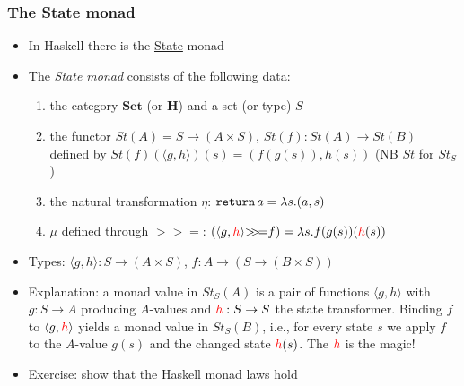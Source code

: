\documentclass[handout]{beamer}
\newcommand{\bfsf}[1]{{\boldsymbol{#1}}}
\newcommand{\Set}{\bfsf{Set}}
\newcommand{\HH}{\bfsf{H}}
\newcommand{\Kp}[1]{{\langle #1 \rangle}}
\newcommand{\bind}{{>}\!\!{>}\!{=}}
\newcommand{\ttt}[1]{\text{\tt #1}}
\begin{document}
\frame
  {   
    \frametitle{The State monad}\label{Mon5:MonadState}

 \begin{itemize}[<+->]
\item In Haskell there is the 
\href{https://wiki.haskell.org/All_About_Monads\#The_State\_monad}%
{\color{blue}State} monad
\item The \emph{State monad} consists of the following data:
 \begin{enumerate}
    \item the category $\Set$ (or $\HH$) and a set (or type) $S$
    \item the functor $St(A) = S \to (A\times S)$, $St(f) : St(A)\to St(B)$ defined by
$St(f)(\Kp{g,h})(s) = (f(g(s)),h(s))$ (NB $St$ for $St_S$)%
    \item the natural transformation $\eta$: $\ttt{return}\,a = \lambda s. (a,s)$
    \item $\mu$ defined through $\bind$:
$(\Kp{g,{\color{red}h}} \bind f ) =  \lambda s. f(g(s))({\color{red}h}(s))$
 \end{enumerate}
\item Types: $\Kp{g,h}: S \to (A\times S)$, $f: A\to (S \to (B\times S))$ 
\item Explanation: a monad value in $St_S(A)$ is a pair of functions  $\Kp{g,h}$
with $g:S\to A$ producing $A$-values and ${\color{red}h}:S\to S$ the state transformer.
Binding $f$ to $\Kp{g,{\color{red}h}}$ yields a monad value in $St_S(B)$, i.e.,
for every state $s$ we apply $f$ to the $A$-value $g(s)$ and 
the changed state ${\color{red}h}(s)$. The ${\color{red}h}$ is the magic!
\item Exercise: show that the Haskell monad laws hold
 \end{itemize}

 }
\end{document}
